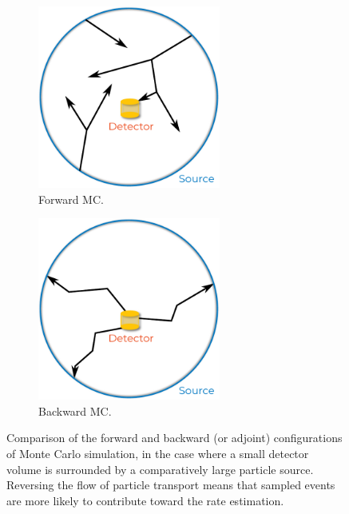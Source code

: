 \begin{figure}
    \centering
    \begin{subfigure}[t]{0.49\textwidth}
        \centering
        \includegraphics[width=0.66\textwidth]{chapter5/bmc_setup.pdf}
        \caption{Forward MC.}
    \end{subfigure}
    \hfill
    \begin{subfigure}[t]{0.49\textwidth}
        \centering
        \includegraphics[width=0.66\textwidth]{chapter5/bmc_setup_backward.pdf}
        \caption{Backward MC.}
    \end{subfigure}
    \caption{
        Comparison of the forward and backward (or adjoint) configurations of
        Monte Carlo simulation, in the case where a small detector volume is
        surrounded by a comparatively large particle source. Reversing the flow
        of particle transport means that sampled events are more likely to
        contribute toward the rate estimation.
    }
    \label{fig:bmc_configuration}
\end{figure}

